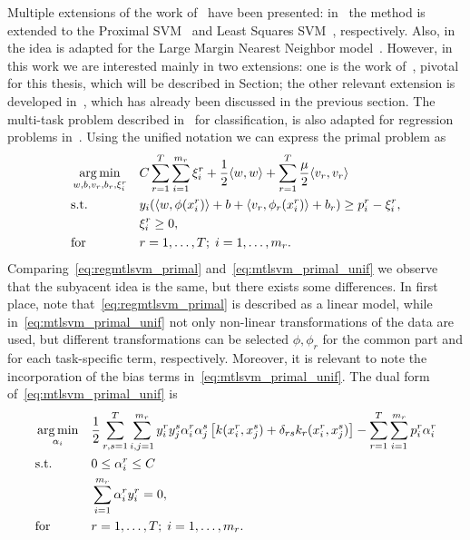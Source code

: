 Multiple extensions of the work of~\cite{EvgeniouP04} have been presented: in~\cite{XuAQZ14, LiTST15} the method is extended to the Proximal SVM~\cite{FungM01} and Least Squares SVM~\cite{SuykensV99}, respectively. Also, in~\cite{ParameswaranW10} the idea is adapted for the Large Margin Nearest Neighbor model~\cite{WeinbergerS09}.
%
However, in this work we are interested mainly in two extensions: one is the work of~\cite{EvgeniouMP05}, pivotal for this thesis, which will be described in Section; the other relevant extension is developed in~\cite{LiangC08}, which has already been discussed in the previous section.
The multi-task problem described in~\cite{LiangC08} for classification, is also adapted for regression problems in~\cite{CaiC09}. Using the unified notation we can express the primal problem as
\begin{equation}
    \label{eq:mtlsvm_primal_unif}
    \begin{aligned}
        & \argmin_{w, b, v_r, b_r, \xi_i^r}
        & & C \sum_{r=1}^\ntasks \sum_{i=1}^{\npertask_r} \xi_i^r + \frac{1}{2} \dotp{w}{w} + \sum_{r=1}^\ntasks \frac{\mu}{2} \dotp{v_r}{v_r} \\
        & \text{s.t.}
        & & y_{i} ( \dotp{w}{\phi(x_{i}^r)} + b + \dotp{v_r}{\phi_r(x_{i}^r)} + b_r) \geq p_i^r - \xi_i^r ,\\
        & & &\xi_i^r \geq 0, \\
        & \text{for } & & r=1, \ldots, \ntasks; \; i=1, \ldots, \npertask_r.
    \end{aligned}
\end{equation}
Comparing~\eqref{eq:regmtlsvm_primal} and~\eqref{eq:mtlsvm_primal_unif} we observe that the subyacent idea is the same, but there exists some differences. In first place, note that~\eqref{eq:regmtlsvm_primal} is described as a linear model, while in~\eqref{eq:mtlsvm_primal_unif} not only non-linear transformations of the data are used, but different transformations can be selected $\phi, \phi_r$ for the common part and for each task-specific term, respectively. Moreover, it is relevant to note the incorporation of the bias terms in~\eqref{eq:mtlsvm_primal_unif}.
The dual form of~\eqref{eq:mtlsvm_primal_unif} is
\begin{equation}\label{eq:mtlsvm_dual_unif}
    \begin{aligned}
        & \argmin_{\alpha_i} 
        & & \frac{1}{2} \sum_{r, s=1}^\ntasks \sum_{i, j=1}^{\npertask_r} y_i^r y_j^s \alpha_i^r \alpha_j^s \left[k(x_i^r, x_j^s) + \delta_{rs} k_r(x^r_i, x^s_j) \right] - \sum_{r=1}^\ntasks \sum_{i=1}^{\npertask_r} p_i^r \alpha_i^r \\
        & \text{s.t.}
        & & 0 \leq \alpha_i^r \leq C \\
        & & & \sum_{i=1}^{\npertask_r}{\alpha_i^r y_i^r} = 0, \\
        & \text{for } & & r=1, \ldots, \ntasks; \; i=1, \ldots, \npertask_r.
        \end{aligned}
\end{equation}
